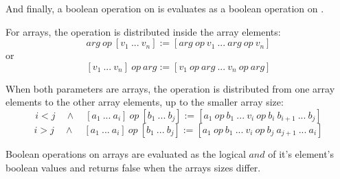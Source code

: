 And finally, a boolean operation on  is evaluates as a boolean operation on .


For arrays, the operation is distributed inside the array elements:
$$ arg\ op\ [v_1\ ...\ v_n]  := [arg\ op\ v_1\ ...\ arg\ op\ v_n] $$
or
$$ [v_1\ ...\ v_n]\ op\ arg  := [v_1\ op\ arg\ ...\ v_n\ op\ arg] $$

When both parameters are arrays, the operation is distributed from one array elements to the other array elements, up to the smaller array size:
$$ i < j\quad \land \quad [a_1\ ...\ a_i]\ op\ [b_1\ ...\ b_j]  := [a_1\ op\ b_1\ ...\ v_i\ op\ b_i\ b_{i+1}\ ... \ b_j] $$
$$ i > j\quad \land \quad [a_1\ ...\ a_i]\ op\ [b_1\ ...\ b_j]  := [a_1\ op\ b_1\ ...\ v_i\ op\ b_j\ a_{j+1}\ ... \ a_i] $$

Boolean operations on arrays are evaluated as the logical $and$ of it's element's boolean values and returns false when the arrays sizes differ.

